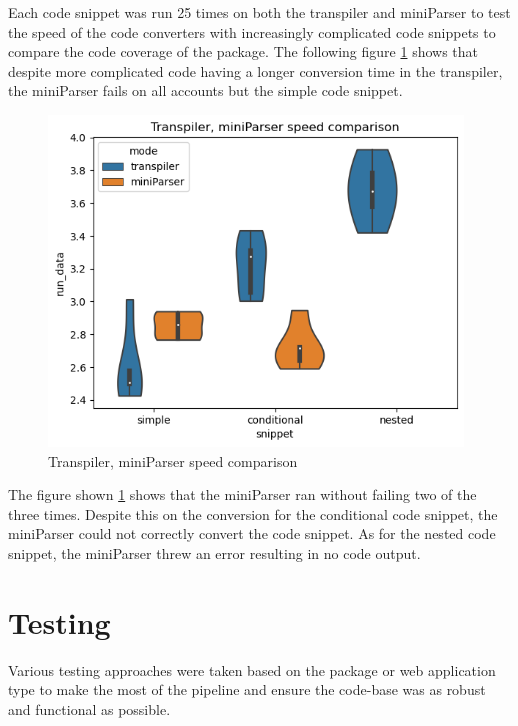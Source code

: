 \documentclass{l4proj}
\begin{document}
Each code snippet was run 25 times on both the transpiler and miniParser to test the speed of the code converters with increasingly complicated code snippets to compare the code coverage of the package. The following figure \ref{fig:transpiler-miniparser-speed-comparison} shows that despite more complicated code having a longer conversion time in the transpiler, the miniParser fails on all accounts but the simple code snippet.

\begin{figure}[H]
    \centering
    \includegraphics[width=11cm]{dissertation/images/transpiler-miniParser-speed-comparison.png}
    \caption{Transpiler, miniParser speed comparison}
    \label{fig:transpiler-miniparser-speed-comparison}
\end{figure}

The figure shown \ref{fig:transpiler-miniparser-speed-comparison} shows that the miniParser ran without failing two of the three times. Despite this on the conversion for the conditional code snippet, the miniParser could not correctly convert the code snippet. As for the nested code snippet, the miniParser threw an error resulting in no code output.


\section{Testing}
Various testing approaches were taken based on the package or web application type to make the most of the pipeline and ensure the code-base was as robust and functional as possible.
\end{document}
